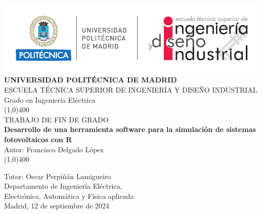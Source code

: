 \begin{center}
\thispagestyle{empty}
\includegraphics[scale=1]{figuras/cabecera.pdf}\\
\vspace*{1cm}
\Large{\textbf{\MakeUppercase{Universidad Politécnica de Madrid}}}\\[3mm]
\Large{{\MakeUppercase{Escuela técnica superior de ingeniería y diseño industrial}}}\\[3mm]
\Large {Grado en Ingeniería Eléctrica}\\
\vfill
\line(1,0){400}\\
\Large{{\MakeUppercase{Trabajo de fin de grado}}}\\
\Huge{\textbf{Desarrollo de una herramienta software para la simulación de sistemas fotovoltaicos con R}}\\[5mm]
\Large{Autor: Francisco Delgado López}\\
\line(1,0){400}\\
\vfill
\end{center}
\begin{flushright}
\Large {Tutor: Oscar Perpiñán Lamigueiro}\\[3mm]
\Large{Departamento de Ingeniería Eléctrica,\\ Electrónica, Automática y Física aplicada}\\[10mm]
Madrid, 12 de septiembre de 2024
\end{flushright}
\cleardoublepage 
